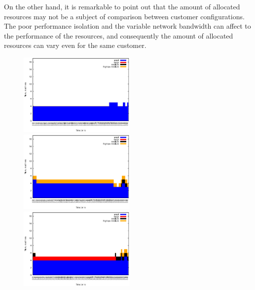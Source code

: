 
On the other hand, it is remarkable to point out that the amount of allocated resources may not be a subject of comparison between customer configurations. The poor performance isolation and the variable network bandwidth can affect to the performance of the resources, and consequently the amount of allocated resources can vary even for the same customer.




\begin{figure}[htb]
	\begin{minipage}[b]{0.19\linewidth}
		\includegraphics[width=\linewidth,height=4cm]{images/exps2011/low/das/inst_type_machines.eps}	
	\end{minipage}
\begin{minipage}[b]{0.19\linewidth}
		\includegraphics[width=\linewidth,height=4cm]{images/exps2011/medium_down/das/inst_type_machines.eps}
	\end{minipage}
	\begin{minipage}[b]{0.19\linewidth}
		\includegraphics[width=\linewidth,height=4cm]{images/exps2011/medium/das/inst_type_machines.eps}

\end{minipage}
\end{figure}
